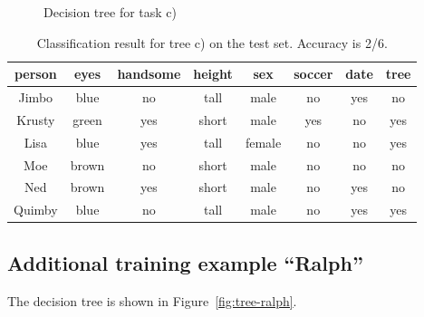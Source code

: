 \documentclass{scrartcl}
\begin{document}
\begin{figure}
\centering 
{}
\caption{Decision tree for task c)}
\label{fig:tree-itchyno}
\end{figure}

\begin{table}[h!]
  \centering
  \begin{tabular}{cccccc|c|c}
    \toprule
    person      & eyes  & handsome & height & sex    & soccer & date & tree\\
    \midrule
    Jimbo       & blue  & no       & tall   & male   & no     & yes & no \\
    Krusty      & green & yes      & short  & male   & yes    & no  & yes\\
    Lisa        & blue  & yes      & tall   & female & no     & no  & yes\\
    Moe         & brown & no       & short  & male   & no     & no  & no \\
    Ned         & brown & yes      & short  & male   & no     & yes & no \\
    Quimby      & blue  & no       & tall   & male   & no     & yes & yes\\
    \bottomrule
  \end{tabular}
  \caption{Classification result for tree c) on the test set. Accuracy is 2/6.}
\end{table}

\subsection{Additional training example ``Ralph''}

The decision tree is shown in Figure~\ref{fig:tree-ralph}.
\end{document}
